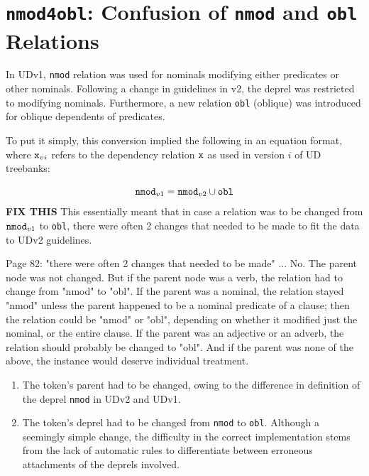 \section{\texttt{nmod4obl}: Confusion of \texttt{nmod} and \texttt{obl} Relations}
\label{sec:probnmod4obl}

In UDv1, \verb|nmod| relation was used for nominals modifying either predicates or other nominals. Following a change in guidelines in v2, the deprel was restricted to modifying nominals. Furthermore, a new relation \verb|obl| (oblique) was introduced for oblique dependents of predicates.

To put it simply, this conversion implied the following in an equation format, where \(\verb|x|_{vi}\) refers to the dependency relation \(\verb|x|\) as used in version \(i\) of UD treebanks:

\begin{equation*}
    \verb|nmod|_{v1} = \verb|nmod|_{v2} \cup \verb|obl|
\end{equation*}
\textbf{FIX THIS}
This essentially meant that in case a relation was to be changed from \(\verb|nmod|_{v1}\) to \verb|obl|, there were often 2 changes that needed to be made to fit the data to UDv2 guidelines.

Page 82: "there were often 2 changes that needed to be made" ... No. The
parent node was not changed. But if the parent node was a verb, the
relation had to change from "nmod" to "obl". If the parent was a
nominal, the relation stayed "nmod" unless the parent happened to be a
nominal predicate of a clause; then the relation could be "nmod" or
"obl", depending on whether it modified just the nominal, or the entire
clause. If the parent was an adjective or an adverb, the relation should
probably be changed to "obl". And if the parent was none of the above,
the instance would deserve individual treatment.

\begin{enumerate}
    \item The token's parent had to be changed, owing to the difference in definition of the deprel \verb|nmod| in UDv2 and UDv1.
    \item The token's deprel had to be changed from \verb|nmod| to \verb|obl|. Although a seemingly simple change, the difficulty in the correct implementation stems from the lack of automatic rules to differentiate between erroneous attachments of the deprels involved.
\end{enumerate}


